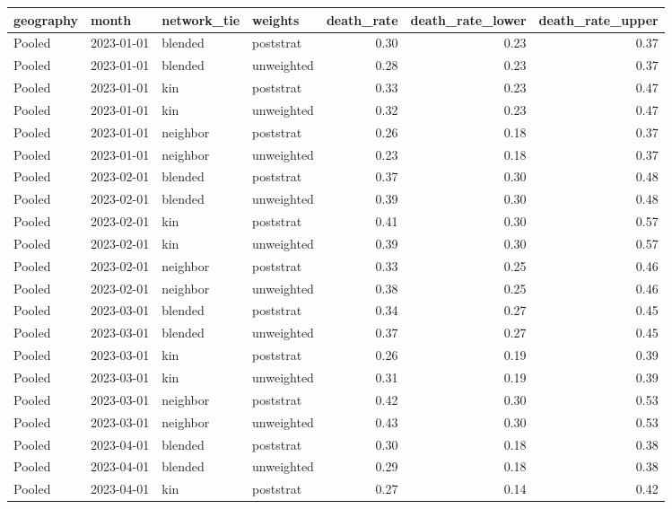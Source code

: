 \begin{table}[ht]
\centering
\begin{tabular}{llllrrr}
  \toprule
geography & month & network\_tie & weights & death\_rate & death\_rate\_lower & death\_rate\_upper \\ 
  \midrule
Pooled & 2023-01-01 & blended & poststrat & 0.30 & 0.23 & 0.37 \\ 
  Pooled & 2023-01-01 & blended & unweighted & 0.28 & 0.23 & 0.37 \\ 
  Pooled & 2023-01-01 & kin & poststrat & 0.33 & 0.23 & 0.47 \\ 
  Pooled & 2023-01-01 & kin & unweighted & 0.32 & 0.23 & 0.47 \\ 
  Pooled & 2023-01-01 & neighbor & poststrat & 0.26 & 0.18 & 0.37 \\ 
  Pooled & 2023-01-01 & neighbor & unweighted & 0.23 & 0.18 & 0.37 \\ 
  Pooled & 2023-02-01 & blended & poststrat & 0.37 & 0.30 & 0.48 \\ 
  Pooled & 2023-02-01 & blended & unweighted & 0.39 & 0.30 & 0.48 \\ 
  Pooled & 2023-02-01 & kin & poststrat & 0.41 & 0.30 & 0.57 \\ 
  Pooled & 2023-02-01 & kin & unweighted & 0.39 & 0.30 & 0.57 \\ 
  Pooled & 2023-02-01 & neighbor & poststrat & 0.33 & 0.25 & 0.46 \\ 
  Pooled & 2023-02-01 & neighbor & unweighted & 0.38 & 0.25 & 0.46 \\ 
  Pooled & 2023-03-01 & blended & poststrat & 0.34 & 0.27 & 0.45 \\ 
  Pooled & 2023-03-01 & blended & unweighted & 0.37 & 0.27 & 0.45 \\ 
  Pooled & 2023-03-01 & kin & poststrat & 0.26 & 0.19 & 0.39 \\ 
  Pooled & 2023-03-01 & kin & unweighted & 0.31 & 0.19 & 0.39 \\ 
  Pooled & 2023-03-01 & neighbor & poststrat & 0.42 & 0.30 & 0.53 \\ 
  Pooled & 2023-03-01 & neighbor & unweighted & 0.43 & 0.30 & 0.53 \\ 
  Pooled & 2023-04-01 & blended & poststrat & 0.30 & 0.18 & 0.38 \\ 
  Pooled & 2023-04-01 & blended & unweighted & 0.29 & 0.18 & 0.38 \\ 
  Pooled & 2023-04-01 & kin & poststrat & 0.27 & 0.14 & 0.42 \\ 

\end{tabular}
\end{table}
